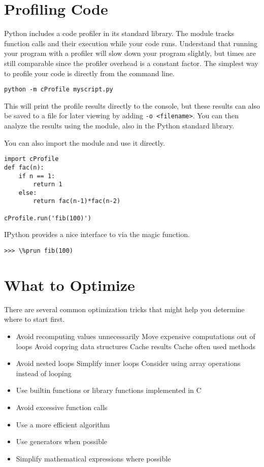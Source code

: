 \section*{Profiling Code}
Python includes a code profiler in its standard library. 
The  module tracks function calls and their execution while your code runs.
Understand that running your program with a profiler will slow down your program slightly, but times are still comparable since the profiler overhead is a constant factor.
The simplest way to profile your code is directly from the command line.
\begin{lstlisting}
python -m cProfile myscript.py
\end{lstlisting}
This will print the profile results directly to the console, but these results can also be saved to a file for later viewing by adding \texttt{-o <filename>}.
You can then analyze the results using the  module, also in the Python standard library.

You can also import the  module and use it directly.
\begin{lstlisting}
import cProfile
def fac(n):
    if n == 1:
        return 1
    else:
        return fac(n-1)*fac(n-2)

cProfile.run('fib(100)')
\end{lstlisting}

IPython provides a nice interface to  via the  magic function.
\begin{lstlisting}
>>> \%prun fib(100)
\end{lstlisting}


\section*{What to Optimize}
There are several common optimization tricks that might help you determine where to start first.
\begin{itemize}
\item Avoid recomputing values unnecessarily
    \subitem Move expensive computations out of loops
    \subitem Avoid copying data structures
    \subitem Cache results
    \subitem Cache often used methods
\item Avoid nested loops
    \subitem Simplify inner loops
    \subitem Consider using array operations instead of looping
\item Use builtin functions or library functions implemented in C
\item Avoid excessive function calls
\item Use a more efficient algorithm
\item Use generators when possible
\item Simplify mathematical expressions where possible
\end{itemize}


